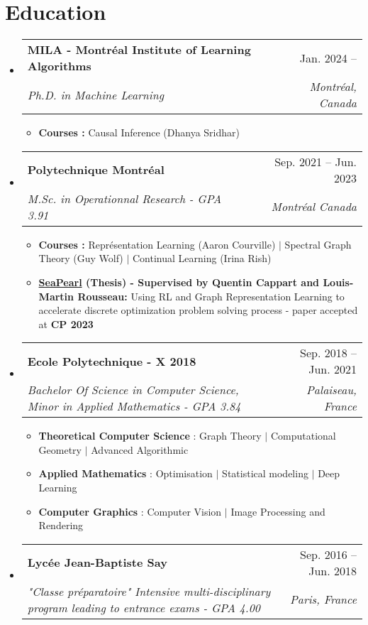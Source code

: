 \documentclass[letterpaper,11pt]{article}
\makeatletter
\newcommand{\resumeSubheading}[4]{
  \vspace{-2pt}\item
    \begin{tabular*}{0.97\textwidth}[t]{l@{\extracolsep{\fill}}r}
      \textbf{#1} & #2 \\
      \textit{\small#3} & \textit{\small #4} \\
    \end{tabular*}\vspace{-7pt}
}
\newcommand{\resumeSubHeadingListStart}{\begin{itemize}[leftmargin=0.15in, label={}]}
\newcommand{\resumeSubHeadingListEnd}{\end{itemize}}
\makeatother
\begin{document}
\section{Education}
  \resumeSubHeadingListStart
        \resumeSubheading
      {MILA - Montréal Institute of Learning Algorithms}{Jan. 2024 -- }
      {Ph.D. in Machine Learning}{Montréal, Canada}
      \vspace{.2pt}
      \begin{itemize}
          \item \textbf{Courses :} Causal Inference (Dhanya Sridhar)
      \end{itemize}
      \resumeSubheading
      {Polytechnique Montréal}{Sep. 2021 -- Jun. 2023}
      {M.Sc. in Operationnal Research - GPA 3.91}{Montréal Canada}
      \vspace{.2pt}
      \begin{itemize}
          \item \textbf{Courses :} Représentation Learning (Aaron Courville) $|$ Spectral Graph Theory (Guy Wolf) $|$ Continual Learning (Irina Rish)  
          \item \textbf{\href{https://github.com/corail-research/SeaPearl.jl}{SeaPearl} (Thesis) - Supervised by Quentin Cappart and Louis-Martin Rousseau:} Using RL and Graph Representation Learning to accelerate discrete optimization problem solving process - paper accepted at \textbf{CP 2023}
      \end{itemize}
    \resumeSubheading
      {Ecole Polytechnique - X 2018}{Sep. 2018 -- Jun. 2021}
      {Bachelor Of Science in Computer Science, Minor in Applied Mathematics - GPA 3.84}{Palaiseau, France}
      \vspace{.2pt}
      \begin{itemize}
          \item \textbf{Theoretical Computer Science} : Graph Theory $|$ Computational Geometry $|$ Advanced Algorithmic
          \item \textbf{Applied Mathematics} : Optimisation $|$ Statistical modeling $|$ Deep Learning
          \item \textbf{Computer Graphics} : Computer Vision $|$ Image Processing and Rendering
      \end{itemize}
    \resumeSubheading
      {Lycée Jean-Baptiste Say}{Sep. 2016 -- Jun. 2018}
      {"Classe préparatoire" Intensive multi-disciplinary program leading to entrance exams - GPA 4.00}{Paris, France} 
  \resumeSubHeadingListEnd


\end{document}
